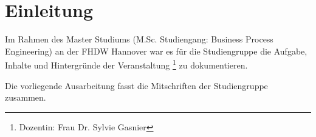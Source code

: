 \section{Einleitung}

Im Rahmen des Master Studiums (M.Sc. Studiengang: Business Process Engineering) an der FHDW Hannover
war es für die Studiengruppe  die Aufgabe, Inhalte und Hintergründe der Veranstaltung \footnote{Dozentin: Frau Dr. Sylvie Gasnier} zu dokumentieren.

Die vorliegende Ausarbeitung fasst die Mitschriften der Studiengruppe zusammen.